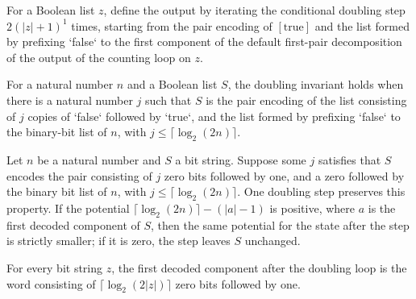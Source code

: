 \begin{definition}
\label{Complexity.BinArith.dblLoop}
\leanok
{}
For a Boolean list $z$, define the output by iterating the conditional doubling step
$2(|z|+1)^1$ times, starting from the pair encoding of $[\mathrm{true}]$ and the list
formed by prefixing `false` to the first component of the default first-pair
decomposition of the output of the counting loop on $z$.
\end{definition}

\begin{definition}
\label{Complexity.BinArith.DblInv}
\leanok
{}
For a natural number $n$ and a Boolean list $S$, the doubling invariant holds when there
is a natural number $j$ such that $S$ is the pair encoding of the list consisting of $j$
copies of `false` followed by `true`, and the list formed by prefixing `false` to the
binary-bit list of $n$, with $j\leq \lceil\log_2(2n)\rceil$.
\end{definition}

\begin{theorem}
\label{Complexity.BinArith.dblInv_step}
\leanok
{}
Let $n$ be a natural number and $S$ a bit string. Suppose some $j$ satisfies that $S$
encodes the pair consisting of $j$ zero bits followed by one, and a zero followed by the
binary bit list of $n$, with $j\leq \lceil\log_2(2n)\rceil$. One doubling step preserves
this property. If the potential $\lceil\log_2(2n)\rceil-(|a|-1)$ is positive, where $a$
is the first decoded component of $S$, then the same potential for the state after the
step is strictly smaller; if it is zero, the step leaves $S$ unchanged.
\end{theorem}

\begin{theorem}
\label{Complexity.BinArith.dblLoop_spec}
\leanok
{}
For every bit string $z$, the first decoded component after the doubling loop is the
word consisting of $\lceil\log_2(2|z|)\rceil$ zero bits followed by one.
\end{theorem}

